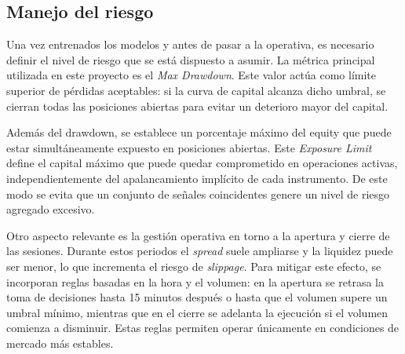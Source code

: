 



\subsection{Manejo del riesgo}

Una vez entrenados los modelos y antes de pasar a la operativa, es necesario definir el nivel de riesgo que se está dispuesto a asumir. La métrica
principal utilizada en este proyecto es el \textit{Max Drawdown}. Este valor actúa como límite superior de pérdidas aceptables: si la curva de capital
alcanza dicho umbral, se cierran todas las posiciones abiertas para evitar un deterioro mayor del capital.

Además del drawdown, se establece un porcentaje máximo del equity que puede estar simultáneamente expuesto en posiciones abiertas. Este
\textit{Exposure Limit} define el capital máximo que puede quedar comprometido en operaciones activas, independientemente del apalancamiento implícito
de cada instrumento. De este modo se evita que un conjunto de señales coincidentes genere un nivel de riesgo agregado excesivo.

Otro aspecto relevante es la gestión operativa en torno a la apertura y cierre de las sesiones. Durante estos periodos el \textit{spread} suele
ampliarse y la liquidez puede ser menor, lo que incrementa el riesgo de \textit{slippage}. Para mitigar este efecto, se incorporan reglas basadas en
la hora y el volumen: en la apertura se retrasa la toma de decisiones hasta 15 minutos después o hasta que el volumen supere un umbral mínimo,
mientras que en el cierre se adelanta la ejecución si el volumen comienza a disminuir. Estas reglas permiten operar únicamente en condiciones de
mercado más estables.


